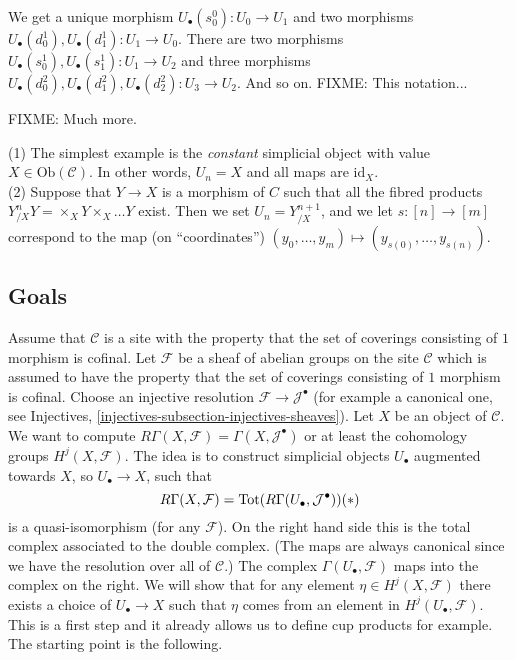 \noindent
We get a unique morphism $U_\bullet(s^0_0) : U_0 \to U_1$ and
two morphisms $U_\bullet(d^1_0), U_\bullet(d^1_1) : U_1 \to U_0$.
There are two morphisms $U_\bullet(s^1_0), U_\bullet(s^1_1) :
U_1 \to U_2$ and three morphisms $U_\bullet(d^2_0), 
U_\bullet(d^2_1), U_\bullet(d^2_2) : U_3 \to U_2$. And so on.
FIXME: This notation...

\smallskip\noindent
FIXME: Much more.

\begin{example}
\label{example-simplicial-products}
(1) The simplest example is the {\it constant} simplicial object with
value $X \in \text{Ob}(\mathcal{C})$. In other words, $U_n=X$ and
all maps are $\text{id}_X$. \\
(2) Suppose that $Y\to X$ is a morphism of $C$ such that all
the fibred products $Y_{/X}^nY = \times_X Y \times_X \ldots Y$ exist.
Then we set $U_n = Y^{n+1}_{/X}$, and we let $s: [n] \to [m]$
correspond to the map (on ``coordinates'') $(y_0,\ldots, y_m) 
\mapsto (y_{s(0)},\ldots, y_{s(n)})$.
\end{example}

\subsection{Goals}

\noindent
Assume that $\mathcal{C}$ is a site with the property
that the set of coverings consisting of $1$ morphism is cofinal.
Let $\mathcal{F}$ be a sheaf of abelian groups on
the site $\mathcal{C}$ which is assumed to have the property
that the set of coverings consisting of $1$ morphism is cofinal.
Choose an injective resolution $\mathcal{F} \to \mathcal{J}^\bullet$
(for example a canonical one, see 
Injectives, \autoref{injectives-subsection-injectives-sheaves}).
Let $X$ be an object of $\mathcal{C}$. We want to compute 
$R\Gamma(X, \mathcal{F}) = \Gamma(X, \mathcal{J}^\bullet)$
or at least the cohomology groups $H^j(X, \mathcal{F})$.
The idea is to construct simplicial objects $U_\bullet$ 
augmented towards $X$, so $U_\bullet \to X$, such that 
$$
R\Gamma(X, \mathcal{F}) 
= \text{Tot}(R\Gamma(U_\bullet, \mathcal{J}^\bullet))
\relax{(*)}
$$
is a quasi-isomorphism (for any $\mathcal{F}$). On the right hand 
side this is the total complex associated to the double complex. 
(The maps are always canonical since we have the resolution over 
all of $\mathcal{C}$.)
The complex $\Gamma(U_\bullet, \mathcal{F})$ maps into the
complex on the right. We will show that for any
element $\eta \in H^j(X, \mathcal{F})$ there exists a choice
of $U_\bullet \to X$ such that $\eta$ comes from an element
in $H^j(U_\bullet, \mathcal{F})$. This is a first step and
it already allows us to define cup products for example.
The starting point is the following.

